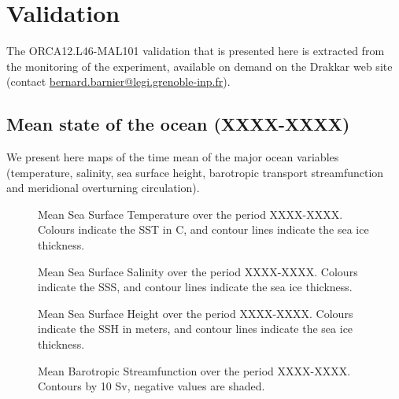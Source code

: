 \section{Validation}

The ORCA12.L46-MAL101 validation that is presented here is extracted 
from the monitoring of the experiment, available on demand on the Drakkar 
web site (contact \href{mailto:bernard.barnier@legi.grenoble-inp.fr}{bernard.barnier@legi.grenoble-inp.fr}).

\subsection{Mean state of the ocean (XXXX-XXXX)}

We present here maps of the time mean of the major ocean variables (temperature, salinity, sea surface height, barotropic transport streamfunction and meridional overturning circulation).

\begin{figure}[H]
\begin{center}
\caption{Mean Sea Surface Temperature over the period XXXX-XXXX. Colours indicate the SST in \degres C, and contour lines indicate the sea ice thickness.}
\end{center}
\end{figure}

\begin{figure}[H]
\begin{center}
\caption{Mean Sea Surface Salinity over the period XXXX-XXXX. Colours indicate the SSS, and contour lines indicate the sea ice thickness.}
\end{center}
\end{figure}

\begin{figure}[H]
\begin{center}
\caption{Mean Sea Surface Height over the period XXXX-XXXX. Colours indicate the SSH in meters, and contour lines indicate the sea ice thickness.}
\end{center}
\end{figure}

\begin{figure}[H]
\begin{center}
\caption{Mean Barotropic Streamfunction over the period XXXX-XXXX. Contours by 10 Sv, negative values are shaded.}
\end{center}
\end{figure}

